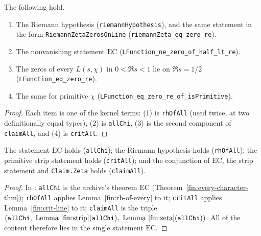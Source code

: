\begin{theorem}\label{fin:main}
The following hold.
\begin{enumerate}
\item The Riemann hypothesis (\texttt{riemannHypothesis}), and the same
statement in the form \texttt{RiemannZetaZerosOnLine}
(\texttt{riemannZeta\_eq\_zero\_re}).
\item The nonvanishing statement $\mathrm{EC}$
(\texttt{LFunction\_ne\_zero\_of\_half\_lt\_re}).
\item The zeros of every $L(s,\chi)$ in $0<\Re s<1$ lie on $\Re s=1/2$
(\texttt{LFunction\_eq\_zero\_re}).
\item The same for primitive $\chi$ (\texttt{LFunction\_eq\_zero\_re\_of\_isPrimitive}).
\end{enumerate}
\end{theorem}
\begin{proof}
Each item is one of the kernel terms: (1) is \texttt{rhOfAll} (used twice, at
two definitionally equal types), (2) is \texttt{allChi}, (3) is the second
component of \texttt{claimAll}, and (4) is \texttt{critAll}.
\end{proof}

\begin{theorem}\label{fin:kernels}
The statement $\mathrm{EC}$ holds (\texttt{allChi}); the Riemann hypothesis holds
(\texttt{rhOfAll}); the primitive strip statement holds (\texttt{critAll}); and
the conjunction of $\mathrm{EC}$, the strip statement and \texttt{Claim.Zeta}
holds (\texttt{claimAll}).
\end{theorem}
\begin{proof}
In : \texttt{allChi} is the
archive's theorem $\mathrm{EC}$ (Theorem~\ref{fin:every-character-thm});
\texttt{rhOfAll} applies Lemma~\ref{fin:rh-of-every} to it; \texttt{critAll}
applies Lemma~\ref{fin:crit-line} to it; \texttt{claimAll} is the triple
$(\texttt{allChi},\ \text{Lemma~\ref{fin:strip}}(\texttt{allChi}),\ \text{Lemma~\ref{fin:zeta}}(\texttt{allChi}))$.
All of the content therefore lies in the single statement $\mathrm{EC}$.
\end{proof}

